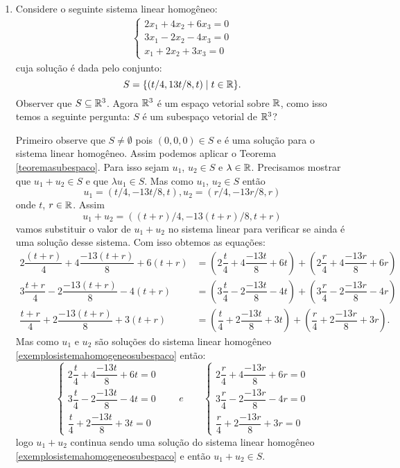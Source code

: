 \begin{exemplos}
	\begin{enumerate}[label={\arabic*})]
		\item Considere o seguinte sistema linear homogêneo:
			\begin{align}\label{exemplosistemahomogeneosubespaco}
				\begin{cases}
					2x_1 + 4x_2 + 6x_3 = 0\\
					3x_1 - 2x_2 - 4x_3 = 0\\
					x_1 + 2x_2 + 3x_3 = 0
				\end{cases}
			\end{align}
			cuja solução é dada pelo conjunto:
			\[
				S = \{(t/4,13t/8,t) \mid t \in \mathbb{R}\}.
			\]
			Observer que $S \subseteq \mathbb{R}^3$. Agora $\mathbb{R}^3$ é um espaço vetorial sobre $\mathbb{R}$, como isso temos a seguinte pergunta: $S$ é um subespaço vetorial de $\mathbb{R}^3$?
			\begin{solucao}
				Primeiro observe que $S \ne \emptyset$ pois $(0,0,0) \in S$ e é uma solução para o sistema linear homogêneo. Assim podemos aplicar o Teorema \ref{teoremasubespaco}. Para isso sejam $u_1$, $u_2 \in S$ e $\lambda \in \mathbb{R}$.
				Precisamos mostrar que $u_1 + u_2 \in S$ e que $\lambda u_1 \in S$. Mas como $u_1$, $u_2 \in S$ então
				\[
					u_1 = (t/4, -13t/8, t),
					u_2 = (r/4, -13r/8,r)
				\]
				onde $t$, $r \in \mathbb{R}$. Assim
				\[
					u_1 + u_2 = ((t + r)/4, -13(t + r)/8, t + r)
				\]
				vamos substituir o valor de $u_1 + u_2$ no sistema linear para verificar se ainda é uma solução desse sistema. Com isso obtemos as equações:
				\begin{align*}
					2\dfrac{(t + r)}{4} + 4\dfrac{-13(t + r)}{8} + 6(t + r) &= (2\dfrac{t}{4} + 4\dfrac{-13t}{8} + 6t) + (2\dfrac{r}{4} + 4\dfrac{-13r}{8} + 6r)\\
					3\dfrac{t + r}{4} - 2\dfrac{-13(t + r)}{8} - 4(t + r) &= (3\dfrac{t}{4} - 2\dfrac{-13t}{8} - 4t) + (3\dfrac{r}{4} - 2\dfrac{-13r}{8} - 4r)\\
					\dfrac{t + r}{4} + 2\dfrac{-13(t + r)}{8} + 3(t + r) &= (\dfrac{t}{4} + 2\dfrac{-13t}{8} + 3t) + (\dfrac{r}{4} + 2\dfrac{-13r}{8} + 3r).
				\end{align*}
			Mas como $u_1$ e $u_2$ são soluções do sistema linear homogêneo \eqref{exemplosistemahomogeneosubespaco} então:
			\[
				\begin{cases}
					2\dfrac{t}{4} + 4\dfrac{-13t}{8} + 6t = 0\\
					3\dfrac{t}{4} - 2\dfrac{-13t}{8} - 4t = 0\\
					\dfrac{t}{4} + 2\dfrac{-13t}{8} + 3t = 0
				\end{cases}
				\qquad e\qquad
				\begin{cases}
					2\dfrac{r}{4} + 4\dfrac{-13r}{8} + 6r = 0\\
					3\dfrac{r}{4} - 2\dfrac{-13r}{8} - 4r = 0\\
					\dfrac{r}{4} + 2\dfrac{-13r}{8} + 3r = 0
				\end{cases}
			\]
			logo $u_1 + u_2$ continua sendo uma solução do sistema linear homogêneo \eqref{exemplosistemahomogeneosubespaco} e então $u_1 + u_2 \in S$.


\end{solucao}
\end{enumerate}
\end{exemplos}

